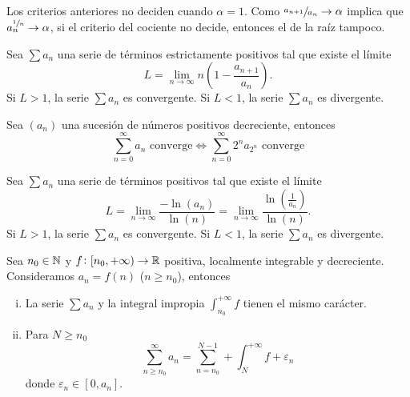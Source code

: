 \begin{obs}
    Los criterios anteriores no deciden cuando $\alpha = 1$. Como $\sfrac{a_{n+1}}{a_n} \to
    \alpha$ implica que $a_n^{\sfrac{1}{n}} \to \alpha$, si el criterio del cociente no
    decide, entonces el de la raíz tampoco.
\end{obs}

\begin{prop}
    Sea $\sum a_n$ una serie de términos estrictamente positivos tal que existe el límite
    \[
        L = \lim_{n \to \infty} n\left( 1 - \frac{a_{n+1}}{a_n} \right).
    \]
    Si $L > 1$, la serie $\sum a_n$ es convergente. Si $L < 1$, la serie $\sum a_n$ es
    divergente.
\end{prop}

\begin{prop*}
    Sea $(a_n)$ una sucesión de números positivos decreciente, entonces
    \[
        \sum_{n=0}^{\infty} a_n \text{ converge} \iff \sum_{n=0}^{\infty} 2^n a_{2^n}
        \text{ converge}
    \]
\end{prop*}

\begin{prop*}
    Sea $\sum a_n$ una serie de términos positivos tal que existe el límite
    \[
        L = \lim_{n \to \infty} \frac{- \ln(a_n)}{\ln(n)} = \lim_{n \to \infty}
        \frac{\ln\left( \frac{1}{a_n} \right)}{\ln(n)}.
    \]
    Si $L > 1$, la serie $\sum a_n$ es convergente. Si $L < 1$, la serie $\sum a_n$ es
    divergente.
\end{prop*}

\begin{prop}
    Sea $n_0 \in \mathbb{N}$ y $f \colon [n_0, +\infty) \to \mathbb{R}$ positiva, localmente integrable
    y decreciente. Consideramos $a_n = f(n)$ ($n \geq n_0$), entonces
    \begin{enumerate}[i)]
        \item La serie $\sum a_n$ y la integral impropia
        $\int_{n_0}^{+\infty} f$ tienen el mismo carácter.
        \item Para $N \geq n_0$
        \[
            \sum_{n \geq n_0}^{\infty} a_n = \sum_{n = n_0}^{N-1} + \int_{N}^{+\infty}f +
            \varepsilon_n
        \]
        donde $\varepsilon_n \in [0, a_n]$.
    \end{enumerate}
\end{prop}

